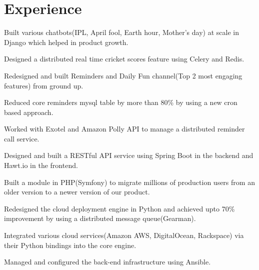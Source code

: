 \documentclass[]{deedy-resume-openfont}
\begin{document}
\begin{minipage}[t]{0.66\textwidth}


\section{Experience}

\vspace{\topsep}
\begin{tightemize}
\item Built various chatbots(IPL, April fool, Earth hour, Mother's day) at scale in Django which helped in product growth.
\item Designed a distributed real time cricket scores feature using Celery and Redis.
\item Redesigned and built Reminders and Daily Fun channel(Top 2 most engaging features) from ground up.
\item Reduced core reminders mysql table by more than 80\% by using a new cron based approach.
\item Worked with Exotel and Amazon Polly API to manage a distributed reminder call service.
\end{tightemize}
\sectionsep

\begin{tightemize}
\item Designed and built a RESTful API service using Spring Boot in the backend and Hawt.io in the frontend.
\item Built a module in PHP(Symfony) to migrate millions of production users from an older version to a newer version of our product.
\end{tightemize}
\sectionsep

\begin{tightemize}
\item Redesigned the cloud deployment engine in Python and achieved upto 70\% improvement by using a distributed message queue(Gearman).
\item Integrated various cloud services(Amazon AWS, DigitalOcean, Rackspace) via their Python bindings into the core engine.
\item Managed and configured the back-end infrastructure using Ansible.
\end{tightemize}
\sectionsep


\end{minipage}
\end{document}
